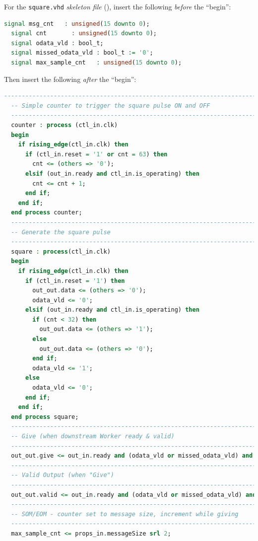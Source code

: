 \bstart
For the \verb+square.vhd+ \textit{skeleton file} (), insert the following \textit{before} the ``begin'':
\begin{lstlisting}[language=vhdl]
  signal msg_cnt   : unsigned(15 downto 0);
  signal cnt       : unsigned(15 downto 0);
  signal odata_vld : bool_t;
  signal missed_odata_vld : bool_t := '0';
  signal max_sample_cnt   : unsigned(15 downto 0);
\end{lstlisting}
\bend
\pagebreak[1]
Then insert the following \textit{after} the ``begin'':
\begin{lstlisting}[language=vhdl]
  -----------------------------------------------------------------------------
  -- Simple counter to trigger the square pulse ON and OFF
  -----------------------------------------------------------------------------
  counter : process (ctl_in.clk)
  begin
    if rising_edge(ctl_in.clk) then
      if (ctl_in.reset = '1' or cnt = 63) then
        cnt <= (others => '0');
      elsif (out_in.ready and ctl_in.is_operating) then
        cnt <= cnt + 1;
      end if;
    end if;
  end process counter;
  -----------------------------------------------------------------------------
  -- Generate the square pulse
  -----------------------------------------------------------------------------
  square : process(ctl_in.clk)
  begin
    if rising_edge(ctl_in.clk) then
      if (ctl_in.reset = '1') then
        out_out.data <= (others => '0');
        odata_vld <= '0';
      elsif (out_in.ready and ctl_in.is_operating) then
        if (cnt < 32) then
          out_out.data <= (others => '1');
        else
          out_out.data <= (others => '0');
        end if;
        odata_vld <= '1';
      else
        odata_vld <= '0';
      end if;
    end if;
  end process square;
  -----------------------------------------------------------------------------
  -- Give (when downstream Worker ready & valid)
  -----------------------------------------------------------------------------
  out_out.give <= out_in.ready and (odata_vld or missed_odata_vld) and ctl_in.is_operating;
  -----------------------------------------------------------------------------
  -- Valid Output (when "Give")
  -----------------------------------------------------------------------------
  out_out.valid <= out_in.ready and (odata_vld or missed_odata_vld) and ctl_in.is_operating;
  -----------------------------------------------------------------------------
  -- SOM/EOM - counter set to message size, increment while giving
  -----------------------------------------------------------------------------
  max_sample_cnt <= props_in.messageSize srl 2;


\end{lstlisting}
